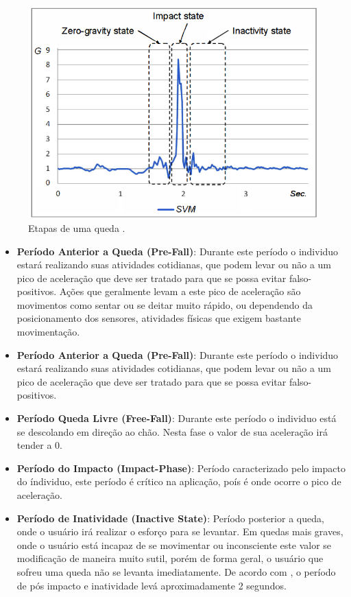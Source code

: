 \begin{figure}[ht]
	\centering
	\includegraphics[width=.8\textwidth]{imagens/fall_states.png}
	\caption{Etapas de uma queda \citep{hsieh2014wrist}.}
	\label{fig:fall_states}
\end{figure} 


\begin{itemize}
	\item{\textbf{Período Anterior a Queda (Pre-Fall)}: Durante este período o individuo estará realizando suas atividades cotidianas, que podem levar ou não a um pico de aceleração que deve ser tratado para que se possa evitar falso-positivos. Ações que geralmente levam a este pico de aceleração são movimentos como sentar ou se deitar muito rápido, ou dependendo da posicionamento dos sensores, atividades físicas que exigem bastante movimentação. }
	
	\item{\textbf{Período Anterior a Queda (Pre-Fall)}: Durante este período o individuo estará realizando suas atividades cotidianas, que podem levar ou não a um pico de aceleração que deve ser tratado para que se possa evitar falso-positivos. }
	
	\item{\textbf{Período Queda Livre (Free-Fall)}: Durante este período o individuo está se descolando em direção ao chão. Nesta fase o valor de sua aceleração irá tender a 0.  }
	
	\item{\textbf{Período do Impacto (Impact-Phase)}: Período caracterizado pelo impacto do índividuo, este período é crítico na aplicação, poís é onde ocorre o pico de aceleração. }
	
	\item{\textbf{Período de Inatividade (Inactive State)}: Período posterior a queda, onde o usuário irá realizar o esforço para se levantar. Em quedas mais graves, onde o usuário está incapaz de se movimentar ou inconsciente este valor se modificação de maneira muito sutil, porém de forma geral, o usuário que sofreu uma queda não se levanta imediatamente. De acordo com \cite{mehner2013location}, o período de pós impacto e inatividade levá aproximadamente 2 segundos.  }
	
\end{itemize}


